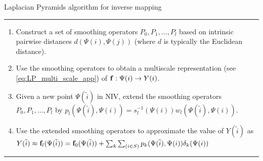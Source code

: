 \begin{table}[tb]
\caption{Laplacian Pyramids algorithm for inverse mapping}
\hrule
\begin{enumerate}

\item
Construct a set of smoothing operators $P_0, P_1, \ldots, P_l$  based on intrinsic pairwise distances $d(\Psi(i),\Psi(j))$ (where $d$ is typically the Euclidean distance).

\item
Use the smoothing operators to obtain a multiscale representation (see \eqref{eq:LP_multi_scale_app}) of $\mathbf{f}:\Psi(i) \rightarrow Y(i)$.

\item Given a new point $\Psi(\tilde{i})$ in NIV, extend the smoothing operators $P_0, P_1, \ldots, P_l$  by
$p_l(\Psi(\tilde{i}), \Psi(i)) = s_l^{-1}(\Psi(i)) w_l(\Psi(\tilde{i}),\Psi(i))$.

\item
Use the extended smoothing operators to approximate the value of $Y(\tilde{i})$ as $Y(\tilde{i}) \approx \mathbf{f}_l(\Psi(\tilde{i})) = \mathbf{f}_0(\Psi(\tilde{i})) + \sum_{k}\sum_{(i \in S)}p_k(\Psi(\tilde{i}), \Psi(i))\delta_k(\Psi(i))$

\end{enumerate}
\hrule
\label{algo_LP}
\end{table}


